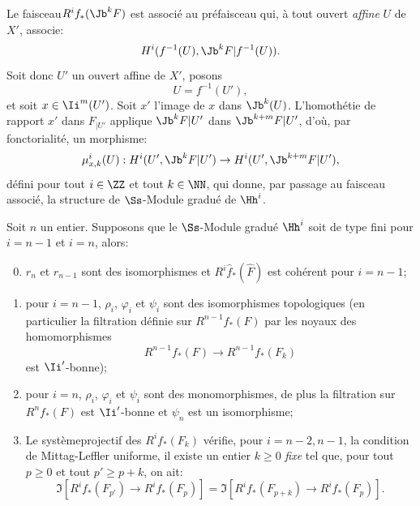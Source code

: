 Le faisceau\pageoriginale $R^if_*({\Jb}^k F)$ est associ\'e au pr\'efaisceau qui, \`a tout ouvert \emph{affine} $U$ de $X'$, associe:
\begin{equation} \label{eq:IX.1.10}
H^i(f^{-1}(U), {\Jb}^k F{|f^{-1}(U)}).
\end{equation} Soit donc $U'$ un ouvert affine de $X'$, posons
\begin{equation*} U=f^{-1}(U'),
\end{equation*}
et soit $x\in {\Ii}^m(U')$. Soit $x'$ l'image de $x$ dans ${\Jb}^{{k}} (U)$. L'homoth\'etie de rapport $x'$ dans $F_{|U'}$ applique ${\Jb}^kF{{|U'}}$ dans ${\Jb}^{k+m}F{{|U'}}$, d'o\`u, par fonctorialit\'e, un morphisme:
\begin{equation} \label{eq:IX.1.11} \mu^i_{x, k}(U):H^i(U', {\Jb}^kF{{|U'}})\to H^i(U', {\Jb}^{k+m}F{{|U'}}),
\end{equation}
d\'efini pour tout $i \in \ZZ$ et tout $k \in \NN$, qui donne, par passage au faisceau associ\'e, la structure de $\Ss$-Module gradu\'e de $\Hh^i$.

\begin{theoreme} \label{IX.1.1} \setcounter{equation}{11}
Soit $n$ un entier. Supposons que le $\Ss$-Module gradu\'e $\Hh^i$ soit de type fini pour $i=n-1$ et $i=n$, alors:
\begin{enumerate}\setcounter{enumi}{-1}
\item
$r_n$ et $r_{n-1}$ sont des isomorphismes et $R^i\hat{f}_*(\hat{F})$ est coh\'erent pour $i=n-1$;
\item
pour $i=n-1$, $\rho_i$, $\varphi_i$ et $\psi_i$ sont des isomorphismes topologiques (en particulier la filtration d\'efinie sur $R^{n-1}f_*(F)$ par les noyaux des homomorphismes
\begin{equation} \label{eq:IX.1.12}
R^{n-1}f_*(F) \to R^{n-1}f_*(F_k)
\end{equation}
est $\Ii'$-bonne);

\item
pour $i=n$, $\rho_i$, $\varphi_i$ et $\psi_i$ sont des monomorphismes, de plus la filtration sur $R^n f_*(F)$ est $\Ii'$-bonne et $\psi_n$ est un isomorphisme;

\item
Le syst\`eme\pageoriginale projectif des $R^i f_*(F_k)$ v\'erifie, pour $i=n-2, n-1$, la condition de Mittag-Leffler uniforme, \ie il existe un entier $k\geq 0$ \emph{fixe} tel que, pour tout $p\geq 0$ et tout $p'\geq p+k$, on ait:
\begin{equation*}
\Im[R^i f_*(F_{p'})\to R^i f_*(F_p)]=\Im[R^i f_*(F_{p+k})\to R^i f_*(F_p)].
\end{equation*}
\end{enumerate}
\end{theoreme}

